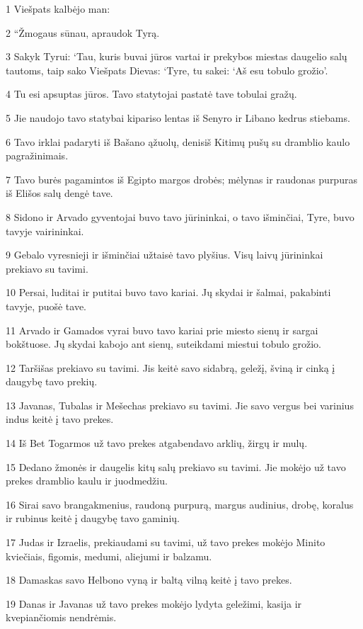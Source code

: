 \par 1 Viešpats kalbėjo man: 
\par 2 “Žmogaus sūnau, apraudok Tyrą. 
\par 3 Sakyk Tyrui: ‘Tau, kuris buvai jūros vartai ir prekybos miestas daugelio salų tautoms, taip sako Viešpats Dievas: ‘Tyre, tu sakei: ‘Aš esu tobulo grožio’. 
\par 4 Tu esi apsuptas jūros. Tavo statytojai pastatė tave tobulai gražų. 
\par 5 Jie naudojo tavo statybai kipariso lentas iš Senyro ir Libano kedrus stiebams. 
\par 6 Tavo irklai padaryti iš Bašano ąžuolų, denis­iš Kitimų pušų su dramblio kaulo pagražinimais. 
\par 7 Tavo burės pagamintos iš Egipto margos drobės; mėlynas ir raudonas purpuras iš Elišos salų dengė tave. 
\par 8 Sidono ir Arvado gyventojai buvo tavo jūrininkai, o tavo išminčiai, Tyre, buvo tavyje vairininkai. 
\par 9 Gebalo vyresnieji ir išminčiai užtaisė tavo plyšius. Visų laivų jūrininkai prekiavo su tavimi. 
\par 10 Persai, luditai ir putitai buvo tavo kariai. Jų skydai ir šalmai, pakabinti tavyje, puošė tave. 
\par 11 Arvado ir Gamados vyrai buvo tavo kariai prie miesto sienų ir sargai bokštuose. Jų skydai kabojo ant sienų, suteikdami miestui tobulo grožio. 
\par 12 Taršišas prekiavo su tavimi. Jis keitė savo sidabrą, geležį, šviną ir cinką į daugybę tavo prekių. 
\par 13 Javanas, Tubalas ir Mešechas prekiavo su tavimi. Jie savo vergus bei varinius indus keitė į tavo prekes. 
\par 14 Iš Bet Togarmos už tavo prekes atgabendavo arklių, žirgų ir mulų. 
\par 15 Dedano žmonės ir daugelis kitų salų prekiavo su tavimi. Jie mokėjo už tavo prekes dramblio kaulu ir juodmedžiu. 
\par 16 Sirai savo brangakmenius, raudoną purpurą, margus audinius, drobę, koralus ir rubinus keitė į daugybę tavo gaminių. 
\par 17 Judas ir Izraelis, prekiaudami su tavimi, už tavo prekes mokėjo Minito kviečiais, figomis, medumi, aliejumi ir balzamu. 
\par 18 Damaskas savo Helbono vyną ir baltą vilną keitė į tavo prekes. 
\par 19 Danas ir Javanas už tavo prekes mokėjo lydyta geležimi, kasija ir kvepiančiomis nendrėmis. 
